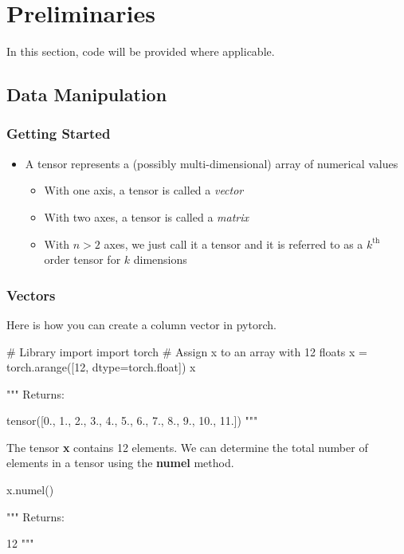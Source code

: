 \documentclass[12pt]{article}
\begin{document}
\newpage
\section{Preliminaries}
In this section, code will be provided where applicable.

\subsection{Data Manipulation}
\subsubsection{Getting Started}
\begin{itemize}
  \item A tensor represents a (possibly multi-dimensional) array of numerical values
  \begin{itemize}
    \item With one axis, a tensor is called a \textit{vector}
    \item With two axes, a tensor is called a \textit{matrix}
    \item With $n > 2$ axes, we just call it a tensor and it is referred to as a $k^{\text{th}}$ order tensor for $k$ dimensions
  \end{itemize}
\end{itemize}

\subsubsection{Vectors}
Here is how you can create a column vector in pytorch.

\vspace{6pt}
\begin{python}
# Library import
import torch
# Assign x to an array with 12 floats
x = torch.arange([12, dtype=torch.float])
x

"""
Returns:

  tensor([0., 1., 2., 3., 4., 5., 6., 7., 8., 9., 10., 11.])
"""
\end{python}
\vspace{6pt}

The tensor \textbf{x} contains 12 elements.  We can determine the total number of elements in a tensor using the \textbf{numel} method.

\vspace{6pt}
\begin{python}
x.numel()

"""
Returns:

  12
"""
\end{python}
\vspace{6pt}
\end{document}
